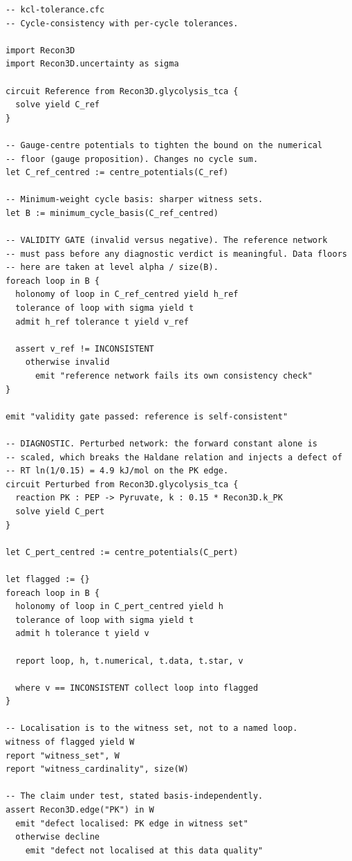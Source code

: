 \documentclass[11pt,a4paper]{article}
\theoremstyle{definition}
\theoremstyle{remark}
\begin{document}
\begin{lstlisting}[caption={The cycle-consistency test with cycle-local
tolerances. Every verdict carries its tolerance by
Theorem S3; the validity gate of Criterion 2.37
precedes any diagnostic claim.},label={lst:program}]
-- kcl-tolerance.cfc
-- Cycle-consistency with per-cycle tolerances.

import Recon3D
import Recon3D.uncertainty as sigma

circuit Reference from Recon3D.glycolysis_tca {
  solve yield C_ref
}

-- Gauge-centre potentials to tighten the bound on the numerical
-- floor (gauge proposition). Changes no cycle sum.
let C_ref_centred := centre_potentials(C_ref)

-- Minimum-weight cycle basis: sharper witness sets.
let B := minimum_cycle_basis(C_ref_centred)

-- VALIDITY GATE (invalid versus negative). The reference network
-- must pass before any diagnostic verdict is meaningful. Data floors
-- here are taken at level alpha / size(B).
foreach loop in B {
  holonomy of loop in C_ref_centred yield h_ref
  tolerance of loop with sigma yield t
  admit h_ref tolerance t yield v_ref

  assert v_ref != INCONSISTENT
    otherwise invalid
      emit "reference network fails its own consistency check"
}

emit "validity gate passed: reference is self-consistent"

-- DIAGNOSTIC. Perturbed network: the forward constant alone is
-- scaled, which breaks the Haldane relation and injects a defect of
-- RT ln(1/0.15) = 4.9 kJ/mol on the PK edge.
circuit Perturbed from Recon3D.glycolysis_tca {
  reaction PK : PEP -> Pyruvate, k : 0.15 * Recon3D.k_PK
  solve yield C_pert
}

let C_pert_centred := centre_potentials(C_pert)

let flagged := {}
foreach loop in B {
  holonomy of loop in C_pert_centred yield h
  tolerance of loop with sigma yield t
  admit h tolerance t yield v

  report loop, h, t.numerical, t.data, t.star, v

  where v == INCONSISTENT collect loop into flagged
}

-- Localisation is to the witness set, not to a named loop.
witness of flagged yield W
report "witness_set", W
report "witness_cardinality", size(W)

-- The claim under test, stated basis-independently.
assert Recon3D.edge("PK") in W
  emit "defect localised: PK edge in witness set"
  otherwise decline
    emit "defect not localised at this data quality"
\end{lstlisting}
\end{document}
